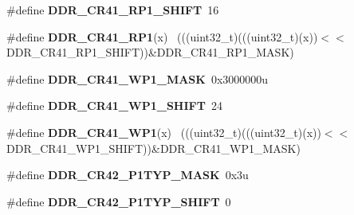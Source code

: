 \begin{DoxyCompactItemize}
\item 
\hypertarget{group___d_d_r___register___masks_gad3ddc206b67fe56c8f452e1c92357447}{}\#define {\bfseries D\+D\+R\+\_\+\+C\+R41\+\_\+\+R\+P1\+\_\+\+S\+H\+I\+F\+T}~16\label{group___d_d_r___register___masks_gad3ddc206b67fe56c8f452e1c92357447}

\item 
\hypertarget{group___d_d_r___register___masks_gaf8381819b2e72fd502f87259bd931cba}{}\#define {\bfseries D\+D\+R\+\_\+\+C\+R41\+\_\+\+R\+P1}(x)                                                ~(((uint32\+\_\+t)(((uint32\+\_\+t)(x))$<$$<$D\+D\+R\+\_\+\+C\+R41\+\_\+\+R\+P1\+\_\+\+S\+H\+I\+F\+T))\&D\+D\+R\+\_\+\+C\+R41\+\_\+\+R\+P1\+\_\+\+M\+A\+S\+K)\label{group___d_d_r___register___masks_gaf8381819b2e72fd502f87259bd931cba}

\item 
\hypertarget{group___d_d_r___register___masks_ga07a75faba4242dfa57bede1689ca283f}{}\#define {\bfseries D\+D\+R\+\_\+\+C\+R41\+\_\+\+W\+P1\+\_\+\+M\+A\+S\+K}~0x3000000u\label{group___d_d_r___register___masks_ga07a75faba4242dfa57bede1689ca283f}

\item 
\hypertarget{group___d_d_r___register___masks_ga633f3f608b4ae885443d0f72deca2620}{}\#define {\bfseries D\+D\+R\+\_\+\+C\+R41\+\_\+\+W\+P1\+\_\+\+S\+H\+I\+F\+T}~24\label{group___d_d_r___register___masks_ga633f3f608b4ae885443d0f72deca2620}

\item 
\hypertarget{group___d_d_r___register___masks_ga68d83a82ff18c8ba5f27480c66435ae2}{}\#define {\bfseries D\+D\+R\+\_\+\+C\+R41\+\_\+\+W\+P1}(x)                                                ~(((uint32\+\_\+t)(((uint32\+\_\+t)(x))$<$$<$D\+D\+R\+\_\+\+C\+R41\+\_\+\+W\+P1\+\_\+\+S\+H\+I\+F\+T))\&D\+D\+R\+\_\+\+C\+R41\+\_\+\+W\+P1\+\_\+\+M\+A\+S\+K)\label{group___d_d_r___register___masks_ga68d83a82ff18c8ba5f27480c66435ae2}

\item 
\hypertarget{group___d_d_r___register___masks_gaad375ffafebec5d3dcfcf2bd40320354}{}\#define {\bfseries D\+D\+R\+\_\+\+C\+R42\+\_\+\+P1\+T\+Y\+P\+\_\+\+M\+A\+S\+K}~0x3u\label{group___d_d_r___register___masks_gaad375ffafebec5d3dcfcf2bd40320354}

\item 
\hypertarget{group___d_d_r___register___masks_gac107be72b4c4850ed6c75611eb2d6051}{}\#define {\bfseries D\+D\+R\+\_\+\+C\+R42\+\_\+\+P1\+T\+Y\+P\+\_\+\+S\+H\+I\+F\+T}~0\label{group___d_d_r___register___masks_gac107be72b4c4850ed6c75611eb2d6051}


\end{DoxyCompactItemize}
